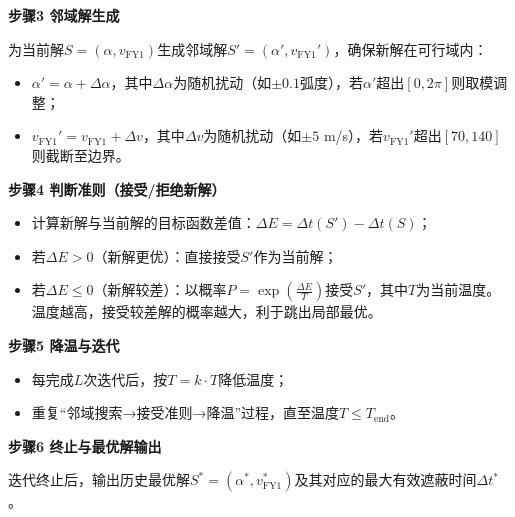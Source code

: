 \documentclass[../main.tex]{subfiles}
\begin{document}
\noindent\textbf{步骤3 邻域解生成}

为当前解$S=(\alpha, v_{\text{FY1}})$生成邻域解$S'=(\alpha', v_{\text{FY1}}')$，确保新解在可行域内：
\begin{itemize}
    \item $\alpha' = \alpha + \Delta\alpha$，其中$\Delta\alpha$为随机扰动（如$\pm0.1$弧度），若$\alpha'$超出$[0,2\pi]$则取模调整；
    \item $v_{\text{FY1}}' = v_{\text{FY1}} + \Delta v$，其中$\Delta v$为随机扰动（如$\pm5$ m/s），若$v_{\text{FY1}}'$超出$[70,140]$则截断至边界。
\end{itemize}

\noindent\textbf{步骤4 判断准则（接受/拒绝新解）}
\begin{itemize}
    \item 计算新解与当前解的目标函数差值：$\Delta E = \Delta t(S') - \Delta t(S)$；
    \item 若$\Delta E > 0$（新解更优）：直接接受$S'$作为当前解；
    \item 若$\Delta E \leq 0$（新解较差）：以概率$P = \exp\left(\frac{\Delta E}{T}\right)$接受$S'$，其中$T$为当前温度。温度越高，接受较差解的概率越大，利于跳出局部最优。
\end{itemize}

\noindent\textbf{步骤5 降温与迭代}
\begin{itemize}
    \item 每完成$L$次迭代后，按$T = k \cdot T$降低温度；
    \item 重复“邻域搜索→接受准则→降温”过程，直至温度$T \leq T_{\text{end}}$。
\end{itemize}

\noindent\textbf{步骤6 终止与最优解输出}

迭代终止后，输出历史最优解$S^*=(\alpha^*, v_{\text{FY1}}^*)$及其对应的最大有效遮蔽时间$\Delta t^*$。
\end{document}
